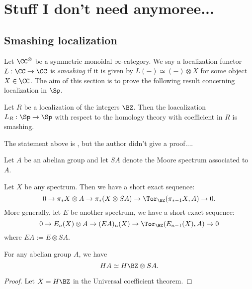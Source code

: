


\section{Stuff I don't need anymoree...}

\subsection{Smashing localization}
Let $\CC^{\otimes}$ be a symmetric monoidal $\infty$-category. We say a localization functor $L:\CC\to\CC$ is \emph{smashing} if it is given by $L(-)\simeq (-)\otimes X$ for some object $X\in\CC$.
The aim of this section is to prove the following result concerning localization in $\Sp$.

\begin{proposition}
\label{HR is smashing}
	Let $R$ be a localization of the integers $\BZ$. Then the loacalization $L_R:\Sp\to \Sp$ with respect to the homology theory with coefficient in $R$ is smashing.
\end{proposition}

\begin{remark}
	The statement above is \cite[Proposition 2.4]{BousfieldSpectra}, but the author didn't give a proof....
\end{remark}

Let $A$ be an abelian group and let $SA$ denote the Moore spectrum associated to $A$. 
\begin{theorem}
	Let $X$ be any spectrum. Then we have a short exact sequence:
	\[
	0\to 
	\pi_{*}X\otimes A \to
	\pi_{*}(X\otimes S A)
	\to
	\Tor_{\BZ}(\pi_{*-1}X, A)\to 
	0.
	\]
	More generally, let $E$ be another spectrum, we have a short exact sequence:
	\[
	0\to 
	E_n(X)\otimes A 
	\to
	(EA)_n(X)
	\to
	\Tor_\BZ(E_{n-1}(X),A)
	\to
	0
	\]
	where $EA:= E\otimes SA$.
\end{theorem}

\begin{corollary}
	For any abelian group $A$, we have 
	\[
	HA\simeq H\BZ\otimes SA.
	\]
\end{corollary}
\begin{proof}
	Let $X=H\BZ$ in the Universal coefficient theorem.
\end{proof}

